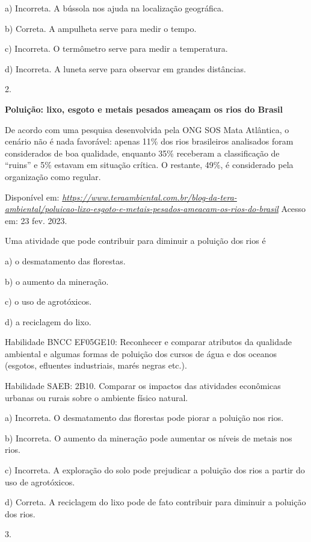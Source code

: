 a) Incorreta. A bússola nos ajuda na localização geográfica.

b) Correta. A ampulheta serve para medir o tempo.

c) Incorreta. O termômetro serve para medir a temperatura.

d) Incorreta. A luneta serve para observar em grandes distâncias.

2.

\textbf{Poluição: lixo, esgoto e metais pesados ameaçam os rios do
Brasil}

De acordo com uma pesquisa desenvolvida pela ONG SOS Mata Atlântica, o
cenário não é nada favorável: apenas 11\% dos rios brasileiros
analisados foram considerados de boa qualidade, enquanto 35\% receberam
a classificação de ``ruins'' e 5\% estavam em situação crítica. O
restante, 49\%, é considerado pela organização como regular.

Disponível em:
\href{https://www.teraambiental.com.br/blog-da-tera-ambiental/poluicao-lixo-esgoto-e-metais-pesados-ameacam-os-rios-do-brasil}{\emph{https://www.teraambiental.com.br/blog-da-tera-ambiental/poluicao-lixo-esgoto-e-metais-pesados-ameacam-os-rios-do-brasil}}
Acesso em: 23 fev. 2023.

Uma atividade que pode contribuir para diminuir a poluição dos rios é

a) o desmatamento das florestas.

b) o aumento da mineração.

c) o uso de agrotóxicos.

d) a reciclagem do lixo.

Habilidade BNCC EF05GE10: Reconhecer e comparar atributos da qualidade
ambiental e algumas formas de poluição dos cursos de água e dos oceanos
(esgotos, efluentes industriais, marés negras etc.).

Habilidade SAEB: 2B10. Comparar os impactos das atividades econômicas
urbanas ou rurais sobre o ambiente físico natural.

a) Incorreta. O desmatamento das florestas pode piorar a poluição nos
rios.

b) Incorreta. O aumento da mineração pode aumentar os níveis de metais
nos rios.

c) Incorreta. A exploração do solo pode prejudicar a poluição dos rios a
partir do uso de agrotóxicos.

d) Correta. A reciclagem do lixo pode de fato contribuir para diminuir a
poluição dos rios.

3.

